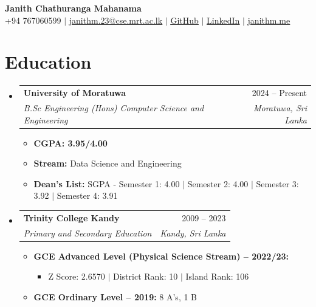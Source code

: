 \documentclass[a4paper,10pt]{article}
\makeatletter
\newcommand{\resumeItem}[1]{\item\small{#1}}
\newcommand{\resumeSubheading}[4]{
  \vspace{-1pt}\item
    \begin{tabular*}{0.97\textwidth}[t]{l@{\extracolsep{\fill}}r}
      \textbf{#1} & #2 \\
      \textit{\small#3} & \textit{\small #4} \\
    \end{tabular*}\vspace{-5pt}
}
\makeatother
\begin{document}
\pagestyle{empty}

\begin{center}
    \textbf{\Huge Janith Chathuranga Mahanama} \\ \vspace{5pt}
    \small +94 767060599 $|$ \href{mailto:janithm.23@cse.mrt.ac.lk}{\underline{janithm.23@cse.mrt.ac.lk}} $|$ \href{https://github.com/Jaybro-git}{\underline{GitHub}} $|$ \href{https://www.linkedin.com/in/janith-mahanama-5b01aa315}{\underline{LinkedIn}} $|$
    \href{https://janithm.me/}{\underline{janithm.me}}
\end{center}

\section{Education}
\begin{itemize}[leftmargin=0.15in, label={}]
    
    \resumeSubheading
      {University of Moratuwa}{2024 -- Present}
      {B.Sc Engineering (Hons) Computer Science and Engineering}{Moratuwa, Sri Lanka}
      \begin{itemize}[leftmargin=0.15in, label={\tiny$\bullet$}]
        \resumeItem{\textbf{CGPA: 3.95/4.00}}
        \resumeItem{\textbf{Stream:} Data Science and Engineering}
        \resumeItem{\textbf{Dean's List:} SGPA - Semester 1: 4.00 $|$ Semester 2: 4.00 $|$ Semester 3: 3.92 $|$ Semester 4: 3.91}
      \end{itemize}

    \resumeSubheading
      {Trinity College Kandy}{2009 -- 2023}
      {Primary and Secondary Education}{Kandy, Sri Lanka}
      \begin{itemize}[leftmargin=0.15in, label={\tiny$\bullet$}]
        \resumeItem{\textbf{GCE Advanced Level (Physical Science Stream) -- 2022/23:}}
        \begin{itemize}
            \item \small{Z Score: 2.6570 $|$ District Rank: 10 $|$ Island Rank: 106}
        \end{itemize}
        \resumeItem{\textbf{GCE Ordinary Level -- 2019:} 8 A's, 1 B}
      \end{itemize}
      
\end{itemize}
\end{document}
